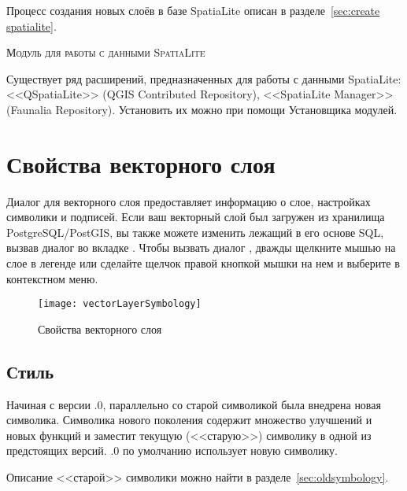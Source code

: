 
Процесс создания новых слоёв в базе SpatiaLite описан в разделе~\ref{sec:create spatialite}.

\begin{Tip}\caption{\textsc{Модуль для работы с данными SpatiaLite}}
Существует ряд расширений, предназначенных для работы с данными SpatiaLite:
<<QSpatiaLite>> (QGIS Contributed Repository), <<SpatiaLite Manager>> (Faunalia
Repository). Установить их можно при помощи Установщика модулей.
\end{Tip}

\section{Свойства векторного слоя}\label{sec:vectorprops}

Диалог  для векторного слоя предоставляет информацию
о слое, настройках символики и подписей. Если ваш векторный слой был загружен
из хранилища PostgreSQL/PostGIS, вы также можете изменить лежащий в его
основе SQL, вызвав диалог  во вкладке .
Чтобы вызвать диалог , дважды щелкните мышью на слое в
легенде или сделайте щелчок правой кнопкой мышки на нем и выберите
 в контекстном меню.

\begin{figure}[ht]
   \centering
   \texttt{[image: vectorLayerSymbology]}
   \caption{Свойства векторного слоя \wincaption}\label{fig:vector_symbology}
 \end{figure}

\subsection{Стиль}\label{sec:symbology}

Начиная с версии .0, параллельно со старой символикой была внедрена
новая символика. Символика нового поколения содержит множество улучшений
и новых функций и заместит текущую (<<старую>>) символику в одной из
предстоящих версий. .0 по умолчанию использует новую символику.

Описание <<старой>> символики можно найти в разделе~\ref{sec:oldsymbology}.


